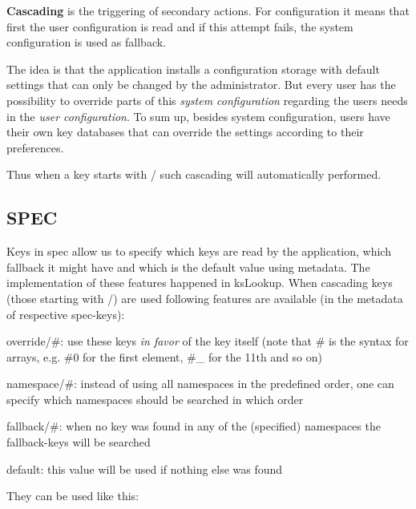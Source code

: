 {\bfseries Cascading} is the triggering of secondary actions. For configuration it means that first the user configuration is read and if this attempt fails, the system configuration is used as fallback.

The idea is that the application installs a configuration storage with default settings that can only be changed by the administrator. But every user has the possibility to override parts of this {\itshape system configuration} regarding the user\textquotesingle{}s needs in the {\itshape user configuration}. To sum up, besides system configuration, users have their own key databases that can override the settings according to their preferences.

Thus when a key starts with {\ttfamily /} such cascading will automatically performed.

\subsection*{S\+P\+EC}

Keys in {\ttfamily spec} allow us to specify which keys are read by the application, which fallback it might have and which is the default value using metadata. The implementation of these features happened in {\ttfamily ks\+Lookup}. When cascading keys (those starting with {\ttfamily /}) are used following features are available (in the metadata of respective {\ttfamily spec}-\/keys)\+:


\begin{DoxyItemize}
\item {\ttfamily override/\#}\+: use these keys {\itshape in favor} of the key itself (note that {\ttfamily \#} is the syntax for arrays, e.\+g. {\ttfamily \#0} for the first element, {\ttfamily \#\+\_} for the 11th and so on)
\item {\ttfamily namespace/\#}\+: instead of using all namespaces in the predefined order, one can specify which namespaces should be searched in which order
\item {\ttfamily fallback/\#}\+: when no key was found in any of the (specified) namespaces the {\ttfamily fallback}-\/keys will be searched
\item {\ttfamily default}\+: this value will be used if nothing else was found
\end{DoxyItemize}

They can be used like this\+: 



